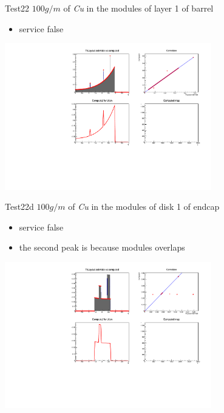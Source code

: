 \documentclass[pdftex, 11pt]{beamer}
\begin{document}
\begin{frame}
  \begin{block}{Test22}
    \alert{$100 g/m$} of \emph{Cu} in the modules of layer 1 of barrel
    \begin{itemize}
    \item \alert{service} false
    \end{itemize}
  \end{block}
  \begin{center}
    \includegraphics[width=9cm]{img/test22.pdf}
  \end{center}
\end{frame}

\begin{frame}
  \begin{block}{Test22d}
    \alert{$100 g/m$} of \emph{Cu} in the modules of disk 1 of endcap
    \begin{itemize}
    \item \alert{service} false
    \item the second peak is because modules overlaps
    \end{itemize}
  \end{block}
  \begin{center}
    \includegraphics[width=9cm]{img/test22d.pdf}
  \end{center}
\end{frame}
\end{document}
